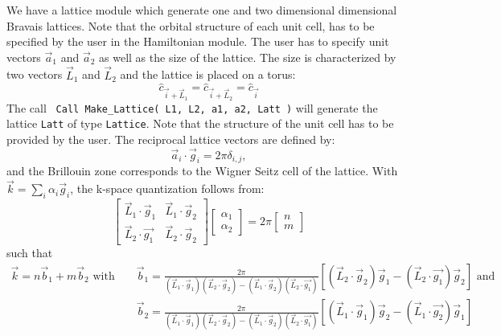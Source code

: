 We have a lattice module  which  generate   one and two dimensional dimensional Bravais lattices.   Note that the  orbital structure of each unit cell, has to be specified by the user  in the  Hamiltonian module. 
 The user has to specify unit vectors $\vec{a}_1$ and $\vec{a}_2$ as well as   the size of the  lattice. The size is  characterized by  two vectors $\vec{L}_1$ and $\vec{L}_2$   and  the lattice is placed on a torus: 
\begin{equation}
	\hat{c}_{\vec{i} + \vec{L}_1 }  = \hat{c}_{\vec{i} + \vec{L}_2 }  = \hat{c}_{\vec{i}}
\end{equation}
The call 
\texttt{ Call Make\_Lattice( L1, L2, a1,  a2, Latt )} will generate the lattice   \texttt{Latt} of type \texttt{Lattice}.   Note that  the structure of the unit cell has to be provided by the user.    The reciprocal lattice vectors are defined by: 
\begin{equation}
\label{Latt.G.eq}
	\vec{a}_i  \cdot \vec{g}_i = 2 \pi \delta_{i,j}, 
\end{equation}
and the Brillouin zone corresponds to the Wigner Seitz cell of the lattice. 
With $\vec{k} = \sum_{i} \alpha_i  \vec{g}_i $, the  k-space quantization follows from: 
\begin{equation}
\begin{bmatrix}
	\vec{L}_1 \cdot \vec{g}_1  &  \vec{L}_1 \cdot \vec{g}_2  \\
	\vec{L}_2  \cdot \vec{g_1} & \vec{L}_2 \cdot  \vec{g}_2  
\end{bmatrix}
\begin{bmatrix}
   \alpha_1 \\
   \alpha_2
\end{bmatrix}
=
2 \pi 
\begin{bmatrix}
   n \\
   m
\end{bmatrix}
\end{equation}
such that 
\begin{eqnarray}
\label{k.quant.eq}
     \vec{k} =  n \vec{b}_1  + m \vec{b}_2 \text{  with  }   & &   \vec{b}_1 = \frac{2 \pi}{ (\vec{L}_1 \cdot \vec{g}_1)  (\vec{L}_2 \cdot  \vec{g}_2 )  - (\vec{L}_1 \cdot \vec{g}_2) (\vec{L}_2  \cdot \vec{g_1} ) }   \left[  (\vec{L}_2 \cdot  \vec{g}_2) \vec{g}_1 -   (\vec{L}_2  \cdot \vec{g_1} ) \vec{g}_2 \right] \text{   and  } \nonumber \\ 
        & & \vec{b}_2 = \frac{2 \pi}{ (\vec{L}_1 \cdot \vec{g}_1)  (\vec{L}_2 \cdot  \vec{g}_2 )  - (\vec{L}_1 \cdot \vec{g}_2) (\vec{L}_2  \cdot \vec{g_1} ) }   
           \left[  (\vec{L}_1 \cdot  \vec{g}_1) \vec{g}_2 -   (\vec{L}_1  \cdot \vec{g_2} ) \vec{g}_1 \right] 
\end{eqnarray}
